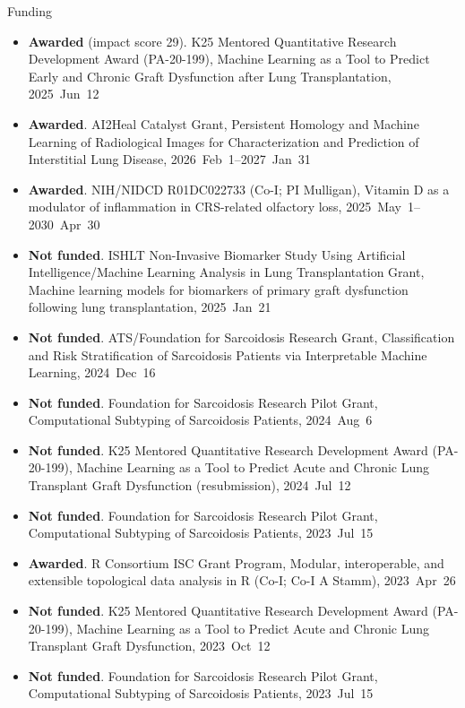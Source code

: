 \documentclass[10pt,a4paper]{article}
\begin{document}
\vspace{.25cm}
{\sc Funding}
\begin{itemize}[label=$\circ$,nolistsep]
\item
{\bfseries Awarded} (impact score 29).
K25 Mentored Quantitative Research Development Award (PA-20-199), Machine Learning as a Tool to Predict Early and Chronic Graft Dysfunction after Lung Transplantation, 2025~Jun~12
\item
{\bfseries Awarded}.
AI2Heal Catalyst Grant,
Persistent Homology and Machine Learning of Radiological Images for Characterization and Prediction of Interstitial Lung Disease,
2026~Feb~1--2027~Jan~31
\item
{\bfseries Awarded}.
NIH/NIDCD R01DC022733 (Co-I; PI Mulligan),
Vitamin D as a modulator of inflammation in CRS-related olfactory loss,
2025~May~1--2030~Apr~30
\item
{\bfseries Not funded}.
ISHLT Non-Invasive Biomarker Study Using Artificial Intelligence/Machine Learning Analysis in Lung Transplantation Grant, Machine learning models for biomarkers of primary graft dysfunction following lung transplantation, 2025~Jan~21
\item
{\bfseries Not funded}.
ATS/Foundation for Sarcoidosis Research Grant, Classification and Risk Stratification of Sarcoidosis Patients via Interpretable Machine Learning, 2024~Dec~16
\item
{\bfseries Not funded}.
Foundation for Sarcoidosis Research Pilot Grant, Computational Subtyping of Sarcoidosis Patients, 2024~Aug~6
\item
{\bfseries Not funded}.
K25 Mentored Quantitative Research Development Award (PA-20-199), Machine Learning as a Tool to Predict Acute and Chronic Lung Transplant Graft Dysfunction (resubmission), 2024~Jul~12
\item
{\bfseries Not funded}.
Foundation for Sarcoidosis Research Pilot Grant, Computational Subtyping of Sarcoidosis Patients, 2023~Jul~15
\item
{\bfseries Awarded}.
R Consortium ISC Grant Program, Modular, interoperable, and extensible topological data analysis in R (Co-I; Co-I A Stamm), 2023~Apr~26
\item
{\bfseries Not funded}.
K25 Mentored Quantitative Research Development Award (PA-20-199), Machine Learning as a Tool to Predict Acute and Chronic Lung Transplant Graft Dysfunction, 2023~Oct~12
\item
{\bfseries Not funded}.
Foundation for Sarcoidosis Research Pilot Grant, Computational Subtyping of Sarcoidosis Patients, 2023~Jul~15

\end{itemize}
\end{document}
